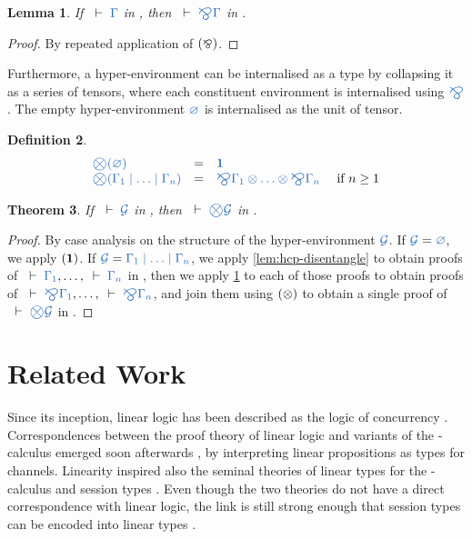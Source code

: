 \documentclass[submission,copyright,creativecommons]{eptcs}
\newtheorem{lemma}{Lemma}[section]
\newtheorem{theorem}[lemma]{Theorem}
\newtheorem{definition}[lemma]{Definition}
\begin{document}
\begin{lemma}\label{lem:cp-bigparr}
  If $\seq{\Gamma}$ in \cp, then $\seq{\bigparr\Gamma}$ in \cp.
\end{lemma} 
\begin{proof}
  By repeated application of $(\mathbin{\bindnasrepma})$.
\end{proof}\noindent
Furthermore, a hyper-environment can be internalised as a type by collapsing it as a series of tensors, where each constituent environment is internalised using $\ty{\bigparr}$. The empty hyper-environment $\ty{\emptyhypercontext}$ is internalised as the unit of tensor.
\begin{definition}\label{def:bigtens}
  \[
  \begin{array}{lcll}
    \ty{\bigtens(\emptyhypercontext)}
    & = & \ty{\one}
    \\
    \ty{\bigtens(\Gamma_1 \hsep \dots \hsep \Gamma_n)}
    & = & \ty{\bigparr\Gamma_1 \tens \dots \tens \bigparr\Gamma_n}
    & \text{ if } n \geq 1
  \end{array}
  \]
\end{definition}\noindent

\begin{theorem}\label{thm:hcp2cp-bigtens}
  If $\seq{\mathcal{G}}$ in \hcp, then $\seq{\bigtens\mathcal{G}}$ in \cp.
\end{theorem} 
\begin{proof}
  By case analysis on the structure of the hyper-environment $\ty{\mathcal{G}}$.
  If $\ty{\mathcal{G}} = \ty{\emptyhypercontext}$, we apply $(\mathbf{1})$.
  If $\ty{\mathcal{G}} = \ty{\Gamma_1 \hsep \dots \hsep \Gamma_n}$, we apply \cref{lem:hcp-disentangle} to obtain proofs of $\seq{\Gamma_1}, \dots, \seq{\Gamma_n}$ in \cp, then we apply \cref{lem:cp-bigparr} to each of those proofs to obtain proofs of $\seq{\bigparr\Gamma_1}, \dots, \seq{\bigparr\Gamma_n}$, and join them using $(\otimes)$ to obtain a single proof of $\seq{\bigtens\mathcal{G}}$ in \cp.
\end{proof}\noindent

\section{Related Work}
\label{sec:related-work}

Since its inception, linear logic has been described as the logic of concurrency \citep{girard1987}. Correspondences between the proof theory of linear logic and variants of the \textpi-calculus emerged soon afterwards \citep{abramsky1994,bellin1994}, by interpreting linear propositions as types for channels. Linearity inspired also the seminal theories of linear types for the \textpi-calculus \citep{kobayashi1999} and session types \citep{honda1998}. Even though the two theories do not have a direct correspondence with linear logic, the link is still strong enough that session types can be encoded into linear types \citep{dardha2017}.
\end{document}
